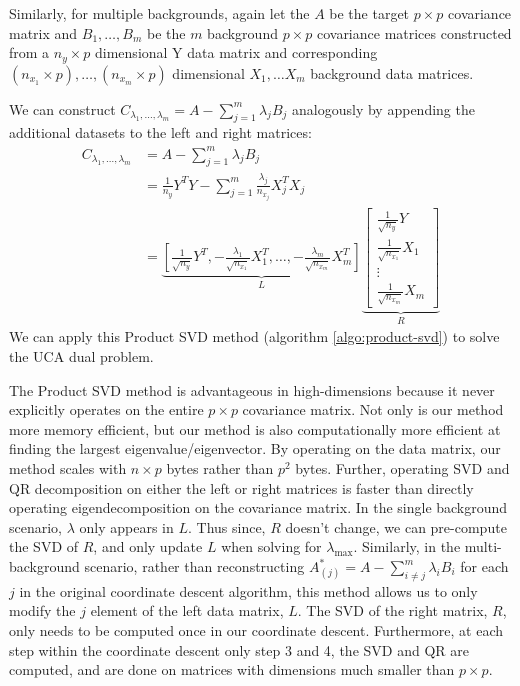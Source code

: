 \documentclass[12pt]{article}
\begin{document}
Similarly, for multiple backgrounds, again let the $A$ be the target $p \times p$ covariance matrix and $ B_1, \ldots, B_m$ be the $m$ background $p \times p$ covariance matrices constructed from a $n_y \times p$ dimensional Y data matrix and corresponding $(n_{x_1} \times p), \ldots, (n_{x_m}\times p)$ dimensional $X_1, \ldots X_m$ background data matrices.

We can construct $C_{\lambda_1, \ldots, \lambda_m} = A - \sum^{m}_{j=1}\lambda_jB_j$ analogously by appending the additional datasets to the left and right matrices:
\begin{align}
  C_{\lambda_1, \ldots, \lambda_m}&= A - \sum^{m}_{j=1}\lambda_jB_j \nonumber \\
                                  &=\frac{1}{n_y}Y^{T}Y -\sum_{j=1}^{m}{\frac{\lambda_{j}}{n_{x_j}}X_{j}^TX_{j}} \nonumber\\
                                  &=  \underbrace{\left[\frac{1}{\sqrt{n_y}}Y^T, -\frac{\lambda_1}{\sqrt{n_{x_{1}}}} X^T_1, \ldots, -\frac{\lambda_m}{\sqrt{n_{x_{m}}}}X^T_m\right]}_{L} \underbrace{\begin{bmatrix} \frac{1}{\sqrt{n_{y}}}Y \\ \frac{1}{\sqrt{n_{x_{1}}}}X_1 \\ \vdots \\ \frac{1}{\sqrt{n_{x_{m}}}}X_m \end{bmatrix}}_{R} \label{eq:8}
\end{align}
We can apply this Product SVD method (algorithm \ref{algo:product-svd}) to solve the UCA dual problem.

The Product SVD method is advantageous in high-dimensions because it never explicitly operates on the entire $p \times p$ covariance matrix. 
Not only is our method more memory efficient, but our method is also computationally more efficient at finding the largest eigenvalue/eigenvector. By operating on the data matrix, our method scales with $n\times p$ bytes rather than $p^2$ bytes. Further, operating SVD and QR decomposition on either the left or right matrices is faster than directly operating eigendecomposition on the covariance matrix. In the single background scenario,  $\lambda$ only appears in $L$. Thus since, $R$ doesn't change, we can pre-compute the SVD of $R$, and only update $L$ when solving for $\lambda_{\text{max}}$.
Similarly, in the multi-background scenario, rather than reconstructing $A^{*}_{(j)} = A-\sum^{m}_{i\neq j}\lambda_i B_i$ for each $j$ in the original coordinate descent algorithm, this method allows us to only modify the $j$ element of the left data matrix, $L$.
The SVD of the right matrix, $R$, only needs to be computed once in our coordinate descent. Furthermore, at each step within the coordinate descent only step 3 and 4, the SVD and QR are computed, and are done on matrices with dimensions much smaller than $p \times p$.
\end{document}
